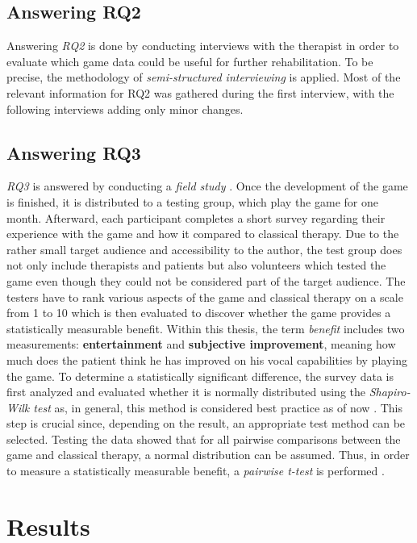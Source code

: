 \documentclass[draft,final]{vutinfth} %
\begin{document}
\section{Answering RQ2}
Answering \emph{RQ2} is done by conducting interviews with the therapist in order to evaluate which game data could be useful for further rehabilitation. To be precise, the methodology of \emph{semi-structured interviewing} \cite{wilde2006methodenspektrum} is applied. Most of the relevant information for RQ2 was gathered during the first interview, with the following interviews adding only minor changes.

\section{Answering RQ3}
\emph{RQ3} is answered by conducting a \emph{field study} \cite{wilde2006methodenspektrum}. Once the development of the game is finished, it is distributed to a testing group, which play the game for one month. Afterward, each participant completes a short survey regarding their experience with the game and how it compared to classical therapy. Due to the rather small target audience and accessibility to the author, the test group does not only include therapists and patients but also volunteers which tested the game even though they could not be considered part of the target audience. The testers have to rank various aspects of the game and classical therapy on a scale from 1 to 10 which is then evaluated to discover whether the game provides a statistically measurable benefit. Within this thesis, the term \emph{benefit} includes two measurements: \textbf{entertainment} and \textbf{subjective improvement}, meaning how much does the patient think he has improved on his vocal capabilities by playing the game. To determine a statistically significant difference, the survey data is first analyzed and evaluated whether it is normally distributed using the \emph{Shapiro-Wilk test} \cite{shaphiro1965analysis} as, in general, this method is considered best practice as of now \cite{hernandez2021testing}. This step is crucial since, depending on the result, an appropriate test method can be selected. Testing the data showed that for all pairwise comparisons between the game and classical therapy, a normal distribution can be assumed. Thus, in order to measure a statistically measurable benefit, a \emph{pairwise t-test} is performed \cite{maxwell1980pairwise}.

\chapter{Results}
\label{chap:results}
\end{document}
